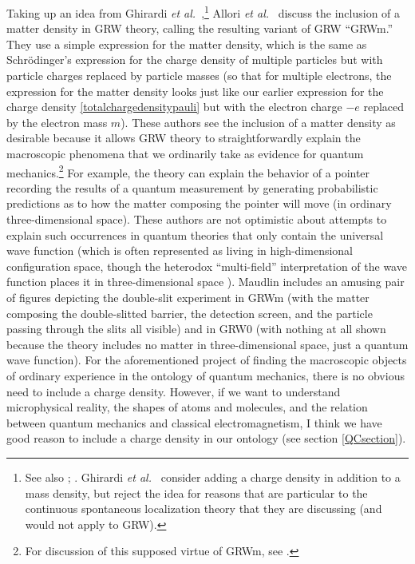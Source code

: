 \documentclass[12pt,onecolumn,secnumarabic,amsmath,amssymb,balancelastpage,nofootinbib]{article}
\begin{document}
Taking up an idea from Ghirardi \emph{et al.}\ \cite{ghirardi1995, ghirardi1997},\footnote{See also \cite[pg.\ 38]{goldstein1998}; \cite{maudlin2007}.  Ghirardi \emph{et al.}\ \cite[sec.\ 4.3]{ghirardi1995} consider adding a charge density in addition to a mass density, but reject the idea for reasons that are particular to the continuous spontaneous localization theory that they are discussing (and would not apply to GRW).} Allori \emph{et al.}\ \cite{tumulka2007, allori2008, allori2011, allori2014, goldstein2012} discuss the inclusion of a matter density in GRW theory, calling the resulting variant of GRW ``GRWm.''  They use a simple expression for the matter density, which is the same as Schr\"{o}dinger's expression for the charge density of multiple particles but with particle charges replaced by particle masses (so that for multiple electrons, the expression for the matter density looks just like our earlier expression for the charge density \eqref{totalchargedensitypauli} but with the electron charge $-e$ replaced by the electron mass $m$).  These authors see the inclusion of a matter density as desirable because it allows GRW theory to straightforwardly explain the macroscopic phenomena that we ordinarily take as evidence for quantum mechanics.\footnote{For discussion of this supposed virtue of GRWm, see \cite{maudlin2007, ney2013, neyalbert2013, ney2021}.}  For example, the theory can explain the behavior of a pointer recording the results of a quantum measurement by generating probabilistic predictions as to how the matter composing the pointer will move (in ordinary three-dimensional space).  These authors are not optimistic about attempts to explain such occurrences in quantum theories that only contain the universal wave function (which is often represented as living in high-dimensional configuration space, though the heterodox ``multi-field'' interpretation of the wave function places it in three-dimensional space \cite{forrest1988, belot2012, hubert2018, chen2017, chen2019, romanoF}).  Maudlin \cite[ch.\ 10]{maudlin2011} includes an amusing pair of figures depicting the double-slit experiment in GRWm (with the matter composing the double-slitted barrier, the detection screen, and the particle passing through the slits all visible) and in GRW0 (with nothing at all shown because the theory includes no matter in three-dimensional space, just a quantum wave function).  For the aforementioned project of finding the macroscopic objects of ordinary experience in the ontology of quantum mechanics, there is no obvious need to include a charge density.  However, if we want to understand microphysical reality, the shapes of atoms and molecules, and the relation between quantum mechanics and classical electromagnetism, I think we have good reason to include a charge density in our ontology (see section \ref{QCsection}).
\end{document}
